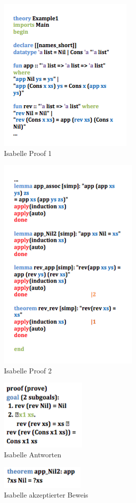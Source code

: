 \begin{figure}
\centering
\caption{Isabelle Proof 1}
\label{fig:isabelle1}
\includegraphics[width=.3\textwidth]{chapters/theoremprovers/isabelle1.png}
\end{figure}

\begin{figure}
\centering
\caption{Isabelle Proof 2}
\label{fig:isabelle2}
\includegraphics[width=.3\textwidth]{chapters/theoremprovers/isabelle2.png}
\end{figure}

\begin{figure}
\centering
\caption{Isabelle Antworten}
\label{fig:isabelle3}
\includegraphics[width=.15\textwidth]{chapters/theoremprovers/isabelle3.png}
\end{figure}

\begin{figure}
\centering
\caption{Isabelle akzeptierter Beweis}
\label{fig:isabelle4}
\includegraphics[width=.2\textwidth]{chapters/theoremprovers/isabelle4.png}
\end{figure}


